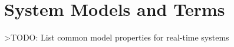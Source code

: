 \section{System Models and Terms}   \label{chap:systemModel}

>TODO: List common model properties for real-time systems